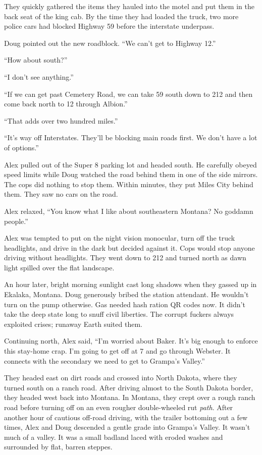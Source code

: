 They quickly gathered the items they hauled into the motel and put them
in the back seat of the king cab. By the time they had loaded the truck,
two more police cars had blocked Highway 59 before the interstate
underpass.

Doug pointed out the new roadblock. ``We can't get to Highway 12.''

``How about south?''

``I don't see anything.''

``If we can get past Cemetery Road, we can take 59 south down to 212 and
then come back north to 12 through Albion.''

``That adds over two hundred miles.''

``It's way off Interstates. They'll be blocking main roads first. We
don't have a lot of options.''

Alex pulled out of the Super 8 parking lot and headed south. He
carefully obeyed speed limits while Doug watched the road behind them in
one of the side mirrors. The cops did nothing to stop them. Within
minutes, they put Miles City behind them. They saw no cars on the road.

Alex relaxed, ``You know what I like about southeastern Montana? No
goddamn people.''

Alex was tempted to put on the night vision monocular, turn off the
truck headlights, and drive in the dark but decided against it. Cops
would stop anyone driving without headlights. They went down to 212 and
turned north as dawn light spilled over the flat landscape.

An hour later, bright morning sunlight cast long shadows when they
gassed up in Ekalaka, Montana. Doug generously bribed the station
attendant. He wouldn't turn on the pump otherwise. Gas needed hash
ration QR codes now. It didn't take the deep state long to snuff civil
liberties. The corrupt fuckers always exploited crises; runaway Earth
suited them.

Continuing north, Alex said, ``I'm worried about Baker. It's big enough
to enforce this stay-home crap. I'm going to get off at 7 and go through
Webster. It connects with the secondary we need to get to Grampa's
Valley.''

They headed east on dirt roads and crossed into North Dakota, where they
turned south on a ranch road. After driving almost to the South Dakota
border, they headed west back into Montana. In Montana, they crept over
a rough ranch road before turning off on an even rougher double-wheeled
rut \emph{path}. After another hour of cautious off-road driving, with
the trailer bottoming out a few times, Alex and Doug descended a gentle
grade into Grampa's Valley. It wasn't much of a valley. It was a small
badland laced with eroded washes and surrounded by flat, barren steppes.

